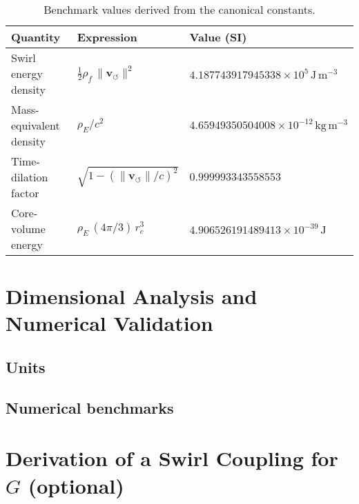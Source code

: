 \documentclass[11pt,a4paper]{article}
\newcommand{\rhoE}{\rho_{!E}}                            %
\begin{document}
\begin{table}[h]
\centering
\caption{Benchmark values derived from the canonical constants.}
\begin{tabular}{@{}lll@{}}
\toprule
Quantity & Expression & Value (SI) \\
\midrule
Swirl energy density & $\tfrac{1}{2}\rho_{\!f}\,\lVert\mathbf{v}_{\!\boldsymbol{\circlearrowleft}}\rVert^2$ & $4.187743917945338\times10^{5}\,\mathrm{J\,m^{-3}}$ \\
Mass-equivalent density & $\rho_{\!E}/c^2$ & $4.65949350504008\times10^{-12}\,\mathrm{kg\,m^{-3}}$ \\
Time-dilation factor & $\sqrt{1-(\lVert\mathbf{v}_{\!\boldsymbol{\circlearrowleft}}\rVert/c)^2}$ & $0.999993343558553$ \\
Core-volume energy & $\rho_{\!E}\,(4\pi/3)\,r_c^3$ & $4.906526191489413\times10^{-39}\,\mathrm{J}$ \\
\bottomrule
\end{tabular}
\end{table}

\section{Dimensional Analysis and Numerical Validation}

\label{app:num}



\subsection{Units}



\subsection{Numerical benchmarks}



\section{Derivation of a Swirl Coupling for $G$ (optional)}

\end{document}
